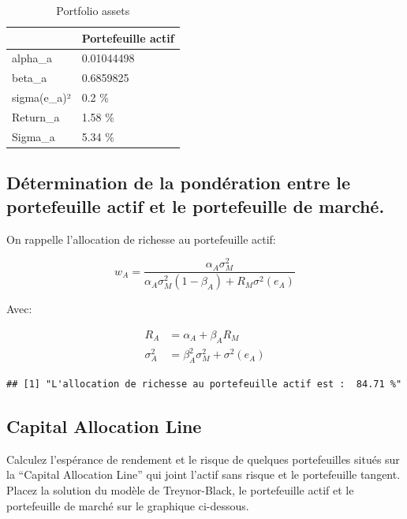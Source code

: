 \documentclass[
]{article}
\begin{document}
\begin{table}[H]

\caption{\label{tab:unnamed-chunk-11}Portfolio assets}
\centering
\begin{tabular}[t]{ll}
\toprule
  & Portefeuille actif\\
\midrule
alpha\_a & 0.01044498\\
beta\_a & 0.6859825\\
sigma(e\_a)² & 0.2 \%\\
Return\_a & 1.58 \%\\
Sigma\_a & 5.34 \%\\
\bottomrule
\end{tabular}
\end{table}

\hypertarget{duxe9termination-de-la-ponduxe9ration-entre-le-portefeuille-actif-et-le-portefeuille-de-marchuxe9.}{%
\subsection{Détermination de la pondération entre le portefeuille actif
et le portefeuille de
marché.}\label{duxe9termination-de-la-ponduxe9ration-entre-le-portefeuille-actif-et-le-portefeuille-de-marchuxe9.}}

On rappelle l'allocation de richesse au portefeuille actif:

\[
w_A = \frac{\alpha_A \sigma^2_M}{\alpha_A \sigma^2_M (1-\beta_A) + R_M \sigma^2(e_A)}
\]

Avec:

\[
\begin{aligned}
R_A & = \alpha_A + \beta_A R_M \\
\sigma^2_A & = \beta^2_A \sigma^2_M + \sigma^2(e_A)
\end{aligned}
\]

\begin{verbatim}
## [1] "L'allocation de richesse au portefeuille actif est :  84.71 %"
\end{verbatim}

\hypertarget{capital-allocation-line}{%
\subsection{Capital Allocation Line}\label{capital-allocation-line}}

Calculez l'espérance de rendement et le risque de quelques portefeuilles
situés sur la ``Capital Allocation Line'' qui joint l'actif sans risque
et le portefeuille tangent. Placez la solution du modèle de
Treynor-Black, le portefeuille actif et le portefeuille de marché sur le
graphique ci-dessous.
\end{document}
